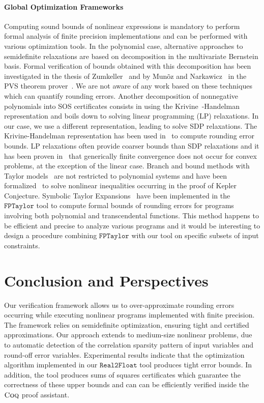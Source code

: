 \documentclass[preprint]{sigplanconf}
\newcommand{\realtofloat}{\mathtt{Real2Float}}
\newcommand{\coq}{\text{\sc Coq}}
\newcommand{\fptaylor}{\mathtt{FPTaylor}}
\theoremstyle{plain}
\begin{document}
\paragraph{Global Optimization Frameworks}
Computing sound bounds of nonlinear expressions is mandatory to perform formal analysis of finite precision implementations and can be performed with various optimization tools. 
In the polynomial case, alternative approaches to semidefinite relaxations are based on decomposition in the multivariate Bernstein basis. Formal verification of bounds obtained with this decomposition has been investigated in the thesis of Zumkeller~\cite{ZumkellerPhD} and by Mun\~oz and Narkawicz~\cite{MN13} in the PVS theorem prover~\cite{PVS}. We are not aware of any work based on these techniques which can quantify rounding errors. Another decomposition of nonnegative polynomials into SOS certificates consists in using the Krivine~\cite{Krivine1964b}-Handelman~\cite{Handelman1988} representation and boils down to solving linear programming (LP) relaxations. In our case, we use a different representation, leading to solve SDP relaxations. The Krivine-Handelman representation has been used in~\cite{Boland10HGR} to compute rounding error bounds. LP relaxations often provide coarser bounds than SDP relaxations and it has been proven in~\cite{lasserre2009moments} that generically finite convergence does not occur for convex problems, at the exception of the linear case. 
Branch and bound methods with Taylor models~\cite{Berz09} are not restricted to polynomial systems and have been formalized~\cite{SolovyevH13} to solve nonlinear inequalities occurring in the proof of Kepler Conjecture. Symbolic Taylor Expansions~\cite{fptaylor15} have been implemented in the $\fptaylor$ tool to compute formal bounds of rounding errors for programs involving both polynomial and transcendental functions. This method happens to be efficient and precise to analyze various programs and it would be interesting to design a procedure combining $\fptaylor$ with our tool on specific subsets of input constraints.

\section{Conclusion and Perspectives} %
%
Our verification framework allows us to over-approximate rounding errors occurring while executing nonlinear programs implemented with finite precision.
The framework relies on semidefinite optimization, ensuring tight and certified approximations. Our approach extends to medium-size nonlinear problems, due to  automatic detection of the correlation sparsity pattern of input variables and round-off error variables. Experimental results indicate that the optimization algorithm implemented in our $\realtofloat$ tool produces tight error bounds. In addition, the tool produces sums of squares certificates which guarantee the correctness of these upper bounds and can can be efficiently verified inside the $\coq$ proof assistant.
\end{document}
